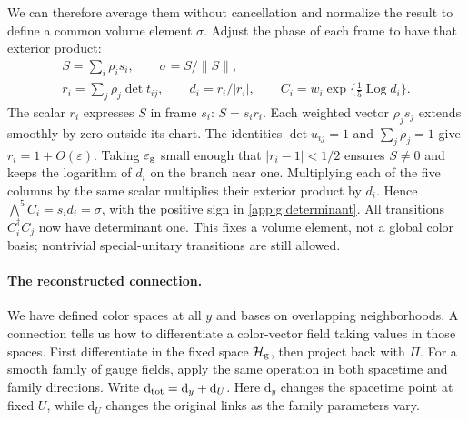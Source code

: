 \documentclass[11pt,a4paper]{article}
\theoremstyle{remark}
\newcommand{\dd}{\mathrm d}
\newcommand{\eps}{\varepsilon}
\begin{document}
We can therefore average them without cancellation and normalize the
result to define a common volume element $\sigma$. Adjust the phase
of each frame to have that exterior product:
\begin{equation}
 \begin{gathered}
 S=\sum_i\rho_i s_i,\qquad \sigma=S/\|S\|,\\
 r_i=\sum_j\rho_j\det t_{ij},\qquad
 d_i=r_i/|r_i|,\qquad
 C_i=w_i\exp\{\tfrac15\operatorname{Log}d_i\}.
 \end{gathered}
 \label{app:g:determinant}
\end{equation}
The scalar $r_i$ expresses $S$ in frame $s_i$: $S=s_i r_i$.
Each weighted vector $\rho_j s_j$ extends smoothly by zero outside
its chart. The identities $\det u_{ij}=1$ and $\sum_j\rho_j=1$
give $r_i=1+O(\eps)$. Taking $\eps_{\rm g}$ small enough that
$|r_i-1|<1/2$ ensures $S\ne0$ and keeps the logarithm of $d_i$ on
the branch near one. Multiplying each of the five columns by the
same scalar multiplies their exterior product by $d_i$. Hence
$\bigwedge^5C_i=s_i d_i=\sigma$, with the positive sign in
\eqref{app:g:determinant}. All transitions $C_i^\dagger C_j$ now
have determinant one. This fixes a volume element, not a global color
basis; nontrivial special-unitary transitions are still allowed.

\paragraph{The reconstructed connection.}
We have defined color spaces at all $y$ and bases on overlapping
neighborhoods. A connection tells us how to differentiate a color-vector
field taking values in those spaces. First differentiate in the fixed
space $\mathcal H_{\rm g}$, then project back with $\Pi$. For a
smooth family of gauge fields, apply the same operation in both
spacetime and family directions. Write
$\dd_{\rm tot}=\dd_y+\dd_U$. Here $\dd_y$ changes the spacetime
point at fixed $U$, while $\dd_U$ changes the original links as the
family parameters vary.
\end{document}
